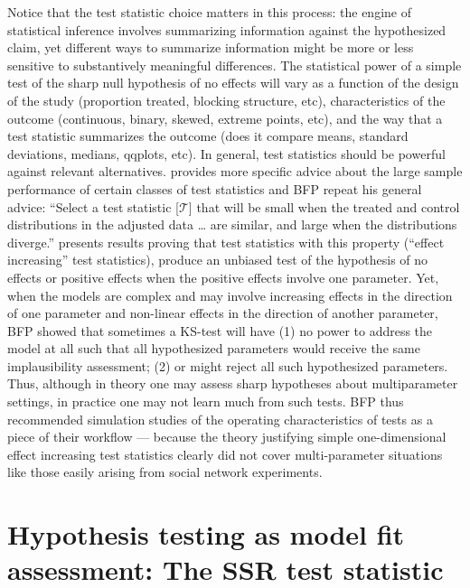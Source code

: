Notice that the test statistic choice matters in this process: the engine of
statistical inference involves summarizing information against the
hypothesized claim, yet different ways to summarize information might be more
or less sensitive to substantively meaningful differences. The statistical
power of a simple test of the sharp null hypothesis of no effects will vary as
a function of the design of the study (proportion treated, blocking structure,
etc), characteristics of the outcome (continuous, binary, skewed, extreme
points, etc), and the way that a test statistic summarizes the outcome (does
it compare means, standard deviations, medians, qqplots, etc). In general,
test statistics should be powerful against relevant alternatives. \citet[\S 2.4.4]{rosenbaum:2002} provides more specific
advice about the large sample performance of certain classes of test statistics
and BFP repeat his general advice: ``Select a test statistic [$\mathcal{T}$] that will be
small when the treated and control distributions in the adjusted data \ldots
are similar, and large when the distributions diverge.'' \cite[Proposition 4
and 5, \S 2.9]{rosenbaum:2002} presents results proving that test statistics
with this property (``effect increasing'' test statistics), produce an
unbiased test of the hypothesis of no effects or positive effects when the
positive effects involve one parameter.  Yet, when the models are complex and
may involve increasing effects in the direction of one parameter and
non-linear effects in the direction of another parameter, BFP showed that
sometimes a KS-test will have (1) no power to address the model at all such
that all hypothesized parameters would receive the same implausibility
assessment; (2) or might reject all such hypothesized parameters. Thus,
although in theory one may assess sharp hypotheses about multiparameter
settings, in practice one may not learn much from such tests. BFP thus recommended simulation studies of the operating
characteristics of tests as a piece of their workflow --- because  the theory
justifying simple one-dimensional effect increasing test statistics clearly
did not cover multi-parameter situations like those easily arising from social
network experiments.

\section{Hypothesis testing as model fit assessment: The SSR test statistic}

